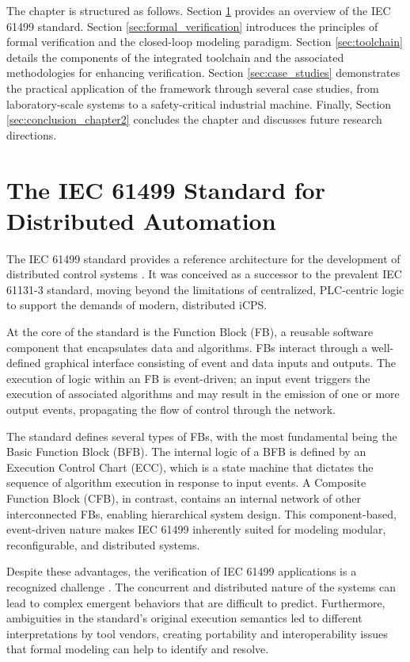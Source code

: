 The chapter is structured as follows. Section \ref{sec:iec61499} provides an overview of the IEC 61499 standard. Section \ref{sec:formal_verification} introduces the principles of formal verification and the closed-loop modeling paradigm. Section \ref{sec:toolchain} details the components of the integrated toolchain and the associated methodologies for enhancing verification. Section \ref{sec:case_studies} demonstrates the practical application of the framework through several case studies, from laboratory-scale systems to a safety-critical industrial machine. Finally, Section \ref{sec:conclusion_chapter2} concludes the chapter and discusses future research directions.

\section{The IEC 61499 Standard for Distributed Automation}\label{sec:iec61499}

The IEC 61499 standard provides a reference architecture for the development of distributed control systems \cite{vyatkin2011iec}. It was conceived as a successor to the prevalent IEC 61131-3 standard, moving beyond the limitations of centralized, PLC-centric logic to support the demands of modern, distributed iCPS.

At the core of the standard is the Function Block (FB), a reusable software component that encapsulates data and algorithms. FBs interact through a well-defined graphical interface consisting of event and data inputs and outputs. The execution of logic within an FB is event-driven; an input event triggers the execution of associated algorithms and may result in the emission of one or more output events, propagating the flow of control through the network.

The standard defines several types of FBs, with the most fundamental being the Basic Function Block (BFB). The internal logic of a BFB is defined by an Execution Control Chart (ECC), which is a state machine that dictates the sequence of algorithm execution in response to input events. A Composite Function Block (CFB), in contrast, contains an internal network of other interconnected FBs, enabling hierarchical system design. This component-based, event-driven nature makes IEC 61499 inherently suited for modeling modular, reconfigurable, and distributed systems.

Despite these advantages, the verification of IEC 61499 applications is a recognized challenge \cite{hanisch2009one}. The concurrent and distributed nature of the systems can lead to complex emergent behaviors that are difficult to predict. Furthermore, ambiguities in the standard's original execution semantics led to different interpretations by tool vendors, creating portability and interoperability issues that formal modeling can help to identify and resolve.

